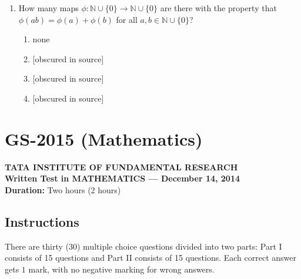 \documentclass[11pt, a4paper]{article}
\begin{document}
\begin{enumerate}[resume]
  \item How many maps $\phi: \mathbb{N} \cup \{0\} \to \mathbb{N} \cup \{0\}$ are there with the property that $\phi(ab) = \phi(a) + \phi(b)$ for all $a, b \in \mathbb{N} \cup \{0\}$?
  \begin{enumerate}[label=\Alph*.]
    \item none
    \item {[obscured in source]}
    \item {[obscured in source]}
    \item {[obscured in source]}
  \end{enumerate}
\end{enumerate}

\newpage

\section{GS-2015 (Mathematics)}

\begin{center}
  \textbf{TATA INSTITUTE OF FUNDAMENTAL RESEARCH}\\
  \textbf{Written Test in MATHEMATICS --- December 14, 2014}\\
  \textbf{Duration:} Two hours (2 hours)
\end{center}

\subsection*{Instructions}
There are thirty (30) multiple choice questions divided into two parts: Part I consists of 15 questions and Part II consists of 15 questions. Each correct answer gets $1$ mark, with no negative marking for wrong answers.
\end{document}

